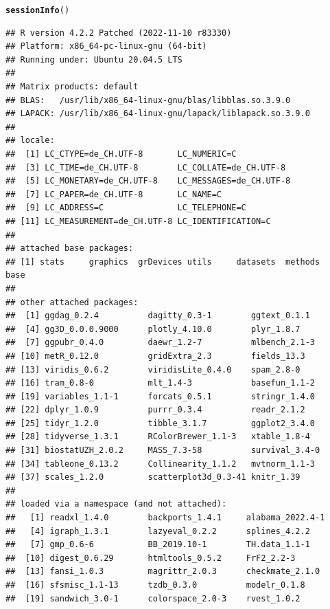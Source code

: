 \documentclass[11pt,a4paper,twoside]{book}\usepackage[]{graphicx}\usepackage[]{xcolor}
\makeatletter
\newcommand{\hlstd}[1]{\textcolor[rgb]{0.345,0.345,0.345}{#1}}%
\newcommand{\hlkwd}[1]{\textcolor[rgb]{0.737,0.353,0.396}{\textbf{#1}}}%
\newenvironment{kframe}{%
 \def\at@end@of@kframe{}%
 \ifinner\ifhmode%
  \def\at@end@of@kframe{\end{minipage}}%
  \begin{minipage}{\columnwidth}%
 \fi\fi%
 \def\FrameCommand##1{\hskip\@totalleftmargin \hskip-\fboxsep
 \colorbox{shadecolor}{##1}\hskip-\fboxsep
     \hskip-\linewidth \hskip-\@totalleftmargin \hskip\columnwidth}%
 \MakeFramed {\advance\hsize-\width
   \@totalleftmargin\z@ \linewidth\hsize
   \@setminipage}}%
 {\par\unskip\endMakeFramed%
 \at@end@of@kframe}
\newenvironment{knitrout}{}{} %
\makeatother
\begin{document}
\newpage
\begin{knitrout}
\color{fgcolor}\begin{kframe}
\begin{alltt}
\hlkwd{sessionInfo}\hlstd{()}
\end{alltt}
\begin{verbatim}
## R version 4.2.2 Patched (2022-11-10 r83330)
## Platform: x86_64-pc-linux-gnu (64-bit)
## Running under: Ubuntu 20.04.5 LTS
## 
## Matrix products: default
## BLAS:   /usr/lib/x86_64-linux-gnu/blas/libblas.so.3.9.0
## LAPACK: /usr/lib/x86_64-linux-gnu/lapack/liblapack.so.3.9.0
## 
## locale:
##  [1] LC_CTYPE=de_CH.UTF-8       LC_NUMERIC=C              
##  [3] LC_TIME=de_CH.UTF-8        LC_COLLATE=de_CH.UTF-8    
##  [5] LC_MONETARY=de_CH.UTF-8    LC_MESSAGES=de_CH.UTF-8   
##  [7] LC_PAPER=de_CH.UTF-8       LC_NAME=C                 
##  [9] LC_ADDRESS=C               LC_TELEPHONE=C            
## [11] LC_MEASUREMENT=de_CH.UTF-8 LC_IDENTIFICATION=C       
## 
## attached base packages:
## [1] stats     graphics  grDevices utils     datasets  methods   base     
## 
## other attached packages:
##  [1] ggdag_0.2.4          dagitty_0.3-1        ggtext_0.1.1        
##  [4] gg3D_0.0.0.9000      plotly_4.10.0        plyr_1.8.7          
##  [7] ggpubr_0.4.0         daewr_1.2-7          mlbench_2.1-3       
## [10] metR_0.12.0          gridExtra_2.3        fields_13.3         
## [13] viridis_0.6.2        viridisLite_0.4.0    spam_2.8-0          
## [16] tram_0.8-0           mlt_1.4-3            basefun_1.1-2       
## [19] variables_1.1-1      forcats_0.5.1        stringr_1.4.0       
## [22] dplyr_1.0.9          purrr_0.3.4          readr_2.1.2         
## [25] tidyr_1.2.0          tibble_3.1.7         ggplot2_3.4.0       
## [28] tidyverse_1.3.1      RColorBrewer_1.1-3   xtable_1.8-4        
## [31] biostatUZH_2.0.2     MASS_7.3-58          survival_3.4-0      
## [34] tableone_0.13.2      Collinearity_1.1.2   mvtnorm_1.1-3       
## [37] scales_1.2.0         scatterplot3d_0.3-41 knitr_1.39          
## 
## loaded via a namespace (and not attached):
##   [1] readxl_1.4.0        backports_1.4.1     alabama_2022.4-1   
##   [4] igraph_1.3.1        lazyeval_0.2.2      splines_4.2.2      
##   [7] gmp_0.6-6           BB_2019.10-1        TH.data_1.1-1      
##  [10] digest_0.6.29       htmltools_0.5.2     FrF2_2.2-3         
##  [13] fansi_1.0.3         magrittr_2.0.3      checkmate_2.1.0    
##  [16] sfsmisc_1.1-13      tzdb_0.3.0          modelr_0.1.8       
##  [19] sandwich_3.0-1      colorspace_2.0-3    rvest_1.0.2        

\end{verbatim}
\end{kframe}
\end{knitrout}
\end{document}
